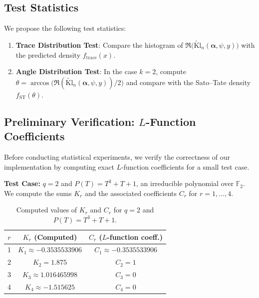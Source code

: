 \documentclass[11pt]{article}
\newcommand{\tKl}{\widetilde{\mathrm{Kl}}}
\begin{document}
\subsection{Test Statistics}

We propose the following test statistics:

\begin{enumerate}
\item \textbf{Trace Distribution Test}: Compare the histogram of $\Re\bigl(\tKl_n(\bm{\alpha},\psi,y)\bigr)$ with the predicted density $f_{\mathrm{trace}}(x)$.
\item \textbf{Angle Distribution Test}: In the case $k=2$, compute $\theta = \arccos\bigl(\Re(\tKl_n(\bm{\alpha},\psi,y))/2\bigr)$ and compare with the Sato--Tate density $f_{\mathrm{ST}}(\theta)$.
\end{enumerate}

\subsection{Preliminary Verification: \texorpdfstring{$L$}{L}-Function Coefficients}

Before conducting statistical experiments, we verify the correctness of our implementation by computing exact $L$-function coefficients for a small test case.

\textbf{Test Case:} $q=2$ and $P(T)=T^3+T+1$, an irreducible polynomial over $\mathbb{F}_2$.  
We compute the sums $K_r$ and the associated coefficients $C_r$ for $r=1,\dots,4$.

\begin{table}[h!]
\centering
\caption{Computed values of $K_r$ and $C_r$ for $q=2$ and $P(T)=T^3+T+1$.}
\begin{tabular}{c|c|c}
\hline
$r$ & $K_r$ (Computed) & $C_r$ ($L$-function coeff.) \\ \hline\hline
1 & $K_1 \approx -0.3535533906$ & $C_1 \approx -0.3535533906$ \\ \hline
2 & $K_2 = 1.875$ & $C_2 = 1$ \\ \hline
3 & $K_3 \approx 1.016465998$ & $C_3 = 0$ \\ \hline
4 & $K_4 \approx -1.515625$ & $C_4 = 0$ \\ \hline
\end{tabular}
\end{table}
\end{document}
